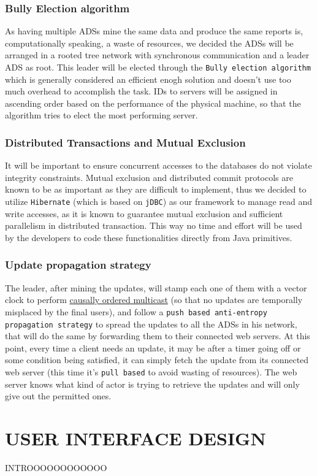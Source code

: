 \documentclass[12pt,a4paper]{article}
\begin{document}
\subsubsection{Bully Election algorithm}
As having multiple ADSs mine the same data and produce the same reports is, computationally speaking, a waste of resources, we decided the ADSs will be arranged in a rooted tree network with synchronous communication and a leader ADS as root. This leader will be elected through the \texttt{Bully election algorithm} which is generally considered an efficient enogh solution and doesn't use too much overhead to accomplish the task. IDs to servers will be assigned in ascending order based on the performance of the physical machine, so that the algorithm tries to elect the most performing server.
\subsubsection{Distributed Transactions and Mutual Exclusion}
It will be important to ensure concurrent accesses to the databases do not violate integrity constraints. Mutual exclusion and distributed commit protocols are known to be as important as they are difficult to implement, thus we decided to utilize \texttt{Hibernate} (which is based on \texttt{jDBC}) as our framework to manage read and write accesses, as it is known to guarantee mutual exclusion and sufficient parallelism in distributed transaction. This way no time and effort will be used by the developers to code these functionalities directly from Java primitives.
\subsubsection{Update propagation strategy}
The leader, after mining the updates, will stamp each one of them with a vector clock to perform \underline{causally ordered multicast} (so that no updates are temporally misplaced by the final users), and follow a \texttt{push based anti-entropy propagation strategy} to spread the updates to all the ADSs in his network, that will do the same by forwarding them to their connected web servers. At this point, every time a client needs an update, it may be after a timer going off or some condition being satisfied, it can simply fetch the update from its connected web server (this time it's \texttt{pull based} to avoid wasting of resources). The web server knows what kind of actor is trying to retrieve the updates and will only give out the permitted ones. 
\section{USER INTERFACE DESIGN}
INTROOOOOOOOOOOO
\\
\end{document}
